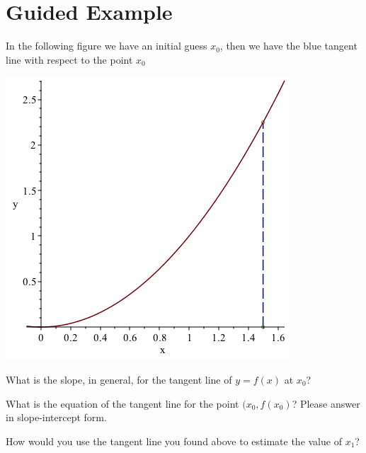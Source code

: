 \documentclass{ximera}
\begin{document}
\section{Guided Example}
In the following figure we have an initial guess $x_{0}$, then we have the blue tangent line with respect to the point $x_{0}$
\begin{image}
\includegraphics{NewtonMethod}
\end{image}
\begin{question}

What is the slope, in general, for the tangent line of $y=f(x)$ at $x_{0}$?

\begin{multipleChoice}
\end{multipleChoice}

What is the equation of the tangent line for the point $(x_{0},f(x_{0})$? Please answer in slope-intercept form.

\begin{multipleChoice}
\end{multipleChoice}

How would you use the tangent line you found above to estimate the value of $x_{1}$?

\begin{freeResponse}
\end{freeResponse}

\end{question}
\end{document}
